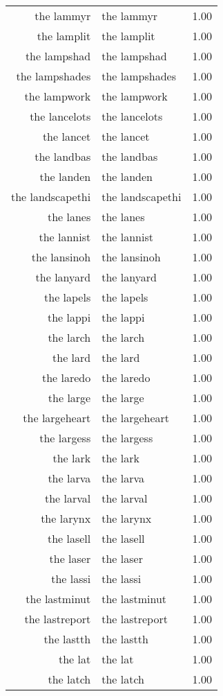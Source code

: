 \begin{table}[ht]
\begin{tabular}{rlr}
  the lammyr & the lammyr & 1.00 \\ 
  the lamplit & the lamplit & 1.00 \\ 
  the lampshad & the lampshad & 1.00 \\ 
  the lampshades & the lampshades & 1.00 \\ 
  the lampwork & the lampwork & 1.00 \\ 
  the lancelots & the lancelots & 1.00 \\ 
  the lancet & the lancet & 1.00 \\ 
  the landbas & the landbas & 1.00 \\ 
  the landen & the landen & 1.00 \\ 
  the landscapethi & the landscapethi & 1.00 \\ 
  the lanes & the lanes & 1.00 \\ 
  the lannist & the lannist & 1.00 \\ 
  the lansinoh & the lansinoh & 1.00 \\ 
  the lanyard & the lanyard & 1.00 \\ 
  the lapels & the lapels & 1.00 \\ 
  the lappi & the lappi & 1.00 \\ 
  the larch & the larch & 1.00 \\ 
  the lard & the lard & 1.00 \\ 
  the laredo & the laredo & 1.00 \\ 
  the large & the large & 1.00 \\ 
  the largeheart & the largeheart & 1.00 \\ 
  the largess & the largess & 1.00 \\ 
  the lark & the lark & 1.00 \\ 
  the larva & the larva & 1.00 \\ 
  the larval & the larval & 1.00 \\ 
  the larynx & the larynx & 1.00 \\ 
  the lasell & the lasell & 1.00 \\ 
  the laser & the laser & 1.00 \\ 
  the lassi & the lassi & 1.00 \\ 
  the lastminut & the lastminut & 1.00 \\ 
  the lastreport & the lastreport & 1.00 \\ 
  the lastth & the lastth & 1.00 \\ 
  the lat & the lat & 1.00 \\ 
  the latch & the latch & 1.00 \\ 

\end{tabular}
\end{table}
